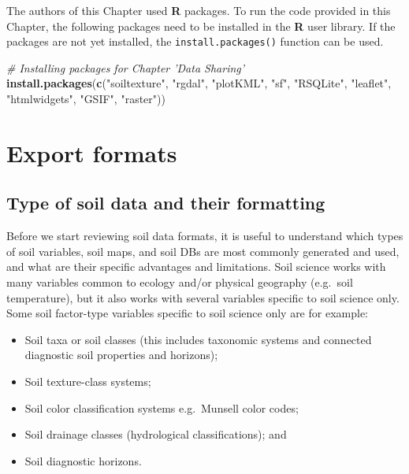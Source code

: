 \documentclass[10pt,b5paper,]{book}
\newenvironment{Shaded}{\begin{snugshade}}{\end{snugshade}}
\newcommand{\CommentTok}[1]{\textcolor[rgb]{0.56,0.35,0.01}{\textit{#1}}}
\newcommand{\KeywordTok}[1]{\textcolor[rgb]{0.13,0.29,0.53}{\textbf{#1}}}
\newcommand{\NormalTok}[1]{#1}
\newcommand{\StringTok}[1]{\textcolor[rgb]{0.31,0.60,0.02}{#1}}
\providecommand{\tightlist}{%
  \setlength{\itemsep}{0pt}\setlength{\parskip}{0pt}}
\theoremstyle{definition}
\theoremstyle{definition}
\theoremstyle{definition}
\theoremstyle{remark}
\begin{document}
The authors of this Chapter used \textbf{R} packages. To run the code
provided in this Chapter, the following packages need to be installed in
the \textbf{R} user library. If the packages are not yet installed, the
\texttt{install.packages()} function can be used.

\begin{Shaded}
\begin{Highlighting}[]
\CommentTok{# Installing packages for Chapter 'Data Sharing'}
\KeywordTok{install.packages}\NormalTok{(}\KeywordTok{c}\NormalTok{(}\StringTok{"soiltexture"}\NormalTok{, }\StringTok{"rgdal"}\NormalTok{, }\StringTok{"plotKML"}\NormalTok{,}
                   \StringTok{"sf"}\NormalTok{, }\StringTok{"RSQLite"}\NormalTok{, }\StringTok{"leaflet"}\NormalTok{,}
                   \StringTok{"htmlwidgets"}\NormalTok{, }\StringTok{"GSIF"}\NormalTok{, }\StringTok{"raster"}\NormalTok{))}
\end{Highlighting}
\end{Shaded}

\hypertarget{export-formats}{%
\section{Export formats}\label{export-formats}}

\hypertarget{type-of-soil-data-and-their-formatting}{%
\subsection{Type of soil data and their
formatting}\label{type-of-soil-data-and-their-formatting}}

Before we start reviewing soil data formats, it is useful to understand
which types of soil variables, soil maps, and soil DBs are most commonly
generated and used, and what are their specific advantages and
limitations. Soil science works with many variables common to ecology
and/or physical geography (e.g.~soil temperature), but it also works
with several variables specific to soil science only. Some soil
factor-type variables specific to soil science only are for example:

\begin{itemize}
\tightlist
\item
  Soil taxa or soil classes (this includes taxonomic systems and
  connected diagnostic soil properties and horizons);
\item
  Soil texture-class systems;
\item
  Soil color classification systems e.g.~Munsell color codes;
\item
  Soil drainage classes (hydrological classifications); and
\item
  Soil diagnostic horizons.
\end{itemize}
\end{document}
